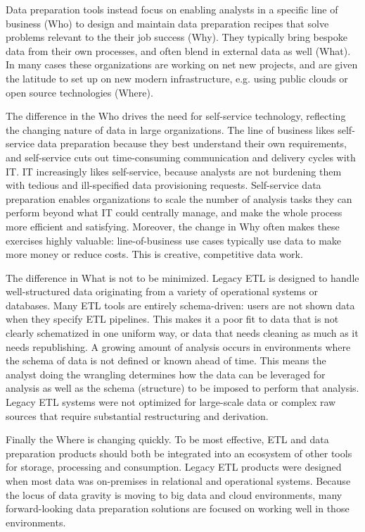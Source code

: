 \documentclass[11pt]{article}
\begin{document}
Data preparation tools instead focus on enabling analysts in a specific line of business (Who) to design and maintain data preparation recipes that solve problems relevant to the their job success (Why). They typically bring bespoke data from their own processes, and often blend in external data as well (What). In many cases these organizations are working on net new projects, and are given the latitude to set up on new modern infrastructure, e.g. using public clouds or open source technologies (Where).

The difference in the Who drives the need for self-service technology, reflecting the changing nature of data in large organizations. The line of business likes self-service data preparation because they best understand their own requirements, and self-service cuts out time-consuming communication and delivery cycles with IT. IT increasingly likes self-service, because analysts are not burdening them with tedious and ill-specified data provisioning requests.  Self-service data preparation enables organizations to scale the number of analysis tasks they can perform beyond what IT could centrally manage, and make the whole process more efficient and satisfying. Moreover, the change in Why often makes these exercises highly valuable: line-of-business use cases typically use data to  make more money or reduce costs. This is creative, competitive data work.

The difference in What is not to be minimized. Legacy ETL is designed to handle well-structured data
originating from a variety of operational systems or databases. Many ETL tools are entirely schema-driven: users are not shown data when they specify ETL pipelines. This makes it a poor fit to data that is not clearly schematized in one uniform way, or data that needs cleaning as much as it needs republishing. A growing amount of analysis occurs in environments where the schema of data is not defined or known ahead of time. This means the analyst doing the wrangling determines how the data can be leveraged for analysis as well as the schema (structure) to be imposed to perform that analysis.
Legacy ETL systems were not optimized for large-scale data or complex raw sources that require substantial restructuring and derivation.
 
Finally the Where is changing quickly. To be most effective, ETL and data preparation products should both be integrated into an ecosystem of other tools for storage, processing and consumption.  Legacy ETL products were designed when most data was on-premises in relational and operational systems.  Because the locus of data gravity is moving to big data and cloud environments, many forward-looking data preparation solutions are focused on working well in those environments.
\end{document}
